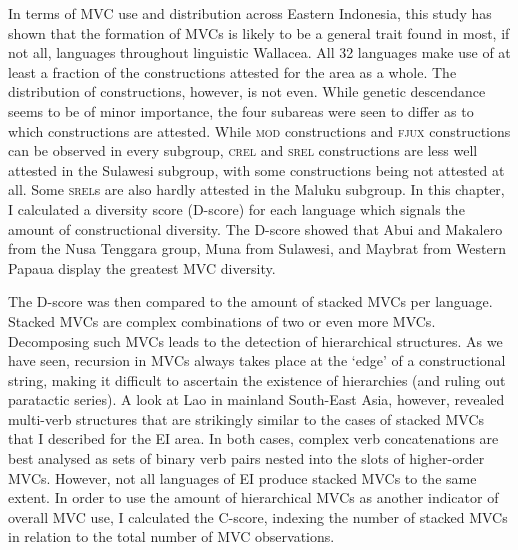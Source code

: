 In terms of MVC use and distribution across Eastern Indonesia, this study has shown that the formation of MVCs is likely to be a general trait found in most, if not all, languages throughout linguistic Wallacea. All 32 languages make use of at least a fraction of the constructions attested for the area as a whole. The distribution of constructions, however, is not even. While genetic descendance seems to be of minor importance, the four subareas were seen to differ as to which constructions are attested. While \textsc{mod} constructions and \textsc{fjux} constructions can be observed in every subgroup, \textsc{crel} and \textsc{srel} constructions are less well attested in the Sulawesi subgroup, with some constructions being not attested at all. Some \textsc{srel}s are also hardly attested in the Maluku subgroup. In this chapter, I calculated a diversity score (D-score) for each language which signals the amount of constructional diversity. The D-score showed that Abui and Makalero from the Nusa Tenggara group, Muna from Sulawesi, and Maybrat from Western Papaua display the greatest MVC diversity. 

The D-score was then compared to the amount of stacked MVCs per language. Stacked MVCs are complex combinations of two or even more MVCs. Decomposing such MVCs leads to the detection of hierarchical structures. As we have seen, recursion in MVCs always takes place at the `edge' of a constructional string, making it difficult to ascertain the existence of hierarchies (and ruling out paratactic series). A look at Lao in mainland South-East Asia, however, revealed multi-verb structures that are strikingly similar to the cases of stacked MVCs that I described for the EI area. In both cases, complex verb concatenations are best analysed as sets of binary verb pairs nested into the slots of higher-order MVCs. However, not all languages of EI produce stacked MVCs to the same extent. In order to use the amount of hierarchical MVCs as another indicator of overall MVC use, I calculated the C-score, indexing the number of stacked MVCs in relation to the total number of MVC observations.

